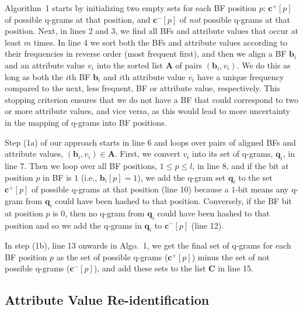 \documentclass{llncs}
\begin{document}
Algorithm~1 starts by initializing two empty sets for each BF
position $p$: $\mathbf{c}^+[p]$ of possible q-grams at that
position, and $\mathbf{c}^-[p]$ of \emph{not} possible q-grams at
that position. Next, in lines 2 and 3, we find all BFs and attribute
values that occur at least $m$ times. In line 4 we sort both the BFs
and attribute values according to their frequencies in reverse order
(most frequent first), and then we align a BF $\mathbf{b}_i$ and an
attribute value $v_i$ into the sorted list $\mathbf{A}$ of pairs
$(\mathbf{b}_i, v_i)$. We do this as long as both the $i$th BF
$\mathbf{b}_i$ and $i$th attribute value $v_i$ have a unique
frequency compared to the next, less frequent, BF or attribute
value, respectively. This stopping criterion ensures that we do not
have a BF that could correspond to two or more attribute values,
and vice versa, as this would lead to more uncertainty in the
mapping of q-grams into BF positions.

Step (1a) of our approach starts in line 6 and loops over pairs of
aligned BFs and attribute values, $(\mathbf{b}_i, v_i) \in
\mathbf{A}$. First, we convert $v_i$ into its set of q-grams,
$\mathbf{q}_i$, in line 7. Then we loop over all BF positions,
$1 \le p \le l$, in line 8, and if the bit at position $p$ in BF is
$1$  (i.e., $\mathbf{b}_i[p] = 1$), we add the q-gram set
$\mathbf{q}_i$ to the set $\mathbf{c}^+[p]$ of possible q-grams at
that position (line 10) because a $1$-bit means any q-gram from
$\mathbf{q}_i$ could have been hashed to that position. Conversely,
if the BF bit at position $p$ is $0$, then no q-gram from
$\mathbf{q}_i$ could have been hashed to that position and so we add
the q-grams in $\mathbf{q}_i$ to $\mathbf{c}^-[p]$ (line 12).

In step (1b), line 13 onwards in Algo.~1, we get the final set of
q-grams for each BF position $p$ as the set of possible q-grams
($\mathbf{c}^+[p]$) minus the set of not possible q-grams
($\mathbf{c}^-[p]$), and add these sets to the list %
$\mathbf{C}$ in line 15.


\subsection{Attribute Value Re-identification}
\label{sec-reidentify}
\end{document}
